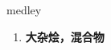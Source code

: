 
\begin{frame}
{\huge medley}
\begin{center}
\begin{enumerate}\Large
  \item \textbf{大杂烩，混合物}
\end{enumerate}
\end{center}
\end{frame}
